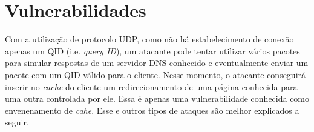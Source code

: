 \documentclass[12pt,openright,a4paper]{report}
\begin{document}
\section{Vulnerabilidades}
\label{sec_vulnerabilidades}

Com a utilização de protocolo UDP, como não há estabelecimento de conexão apenas um QID (i.e. \textit{query ID}), um atacante pode tentar utilizar vários pacotes para simular respostas de um servidor DNS conhecido e eventualmente enviar um pacote com um QID válido para o cliente. Nesse momento, o atacante conseguirá inserir no \textit{cache} do cliente um redirecionamento de uma página conhecida para uma outra controlada por ele. Essa é apenas uma vulnerabilidade conhecida como envenenamento de \textit{cahe}. Esse e outros tipos de ataques são melhor explicados a seguir.\\
\end{document}
